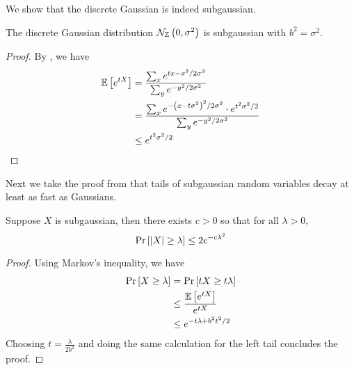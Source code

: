 \documentclass{article}
\begin{document}
We show that the discrete Gaussian is indeed subgaussian.
\begin{lemma}
	The discrete Gaussian distribution $\mathcal{N}_{\mathbb{Z}}\left(0, \sigma^2\right)$ is subgaussian with $b^2=\sigma^2$.
\end{lemma}
\begin{proof}
	By , we have
	\begin{align}
		\operatorname*{\mathbb{E}}\left[e^{tX}\right]
		&=\frac{\sum_x e^{tx-x^2/2\sigma^2}}{\sum_y e^{-y^2/2\sigma^2}} \\
		&=\frac{\sum_x e^{-\left(x-t\sigma^2\right)^2/2\sigma^2}\cdot e^{t^2\sigma^2/2}}{\sum_y e^{-y^2/2\sigma^2}} \\
		&\leq e^{t^2\sigma^2/2}
	\end{align}
\end{proof}

Next we take the proof from \cite{subgaussian} that tails of subgaussian random variables decay at least as fast as Gaussians.
\begin{lemma}
	Suppose $X$ is subgaussian, then there exists $c>0$ so that for all $\lambda>0$,
	\begin{equation}
		\Pr\left[\abs{X}\geq\lambda\right]\leq 2e^{-c\lambda^2}
	\end{equation}
\end{lemma}
\begin{proof}
	Using Markov's inequality, we have
	\begin{align}
		\Pr\left[X\geq\lambda\right]&=\Pr\left[tX\geq t\lambda\right] \\
		&\leq \frac{\operatorname*{\mathbb{E}}\left[e^{tX}\right]}{e^{tX}} \\
		&\leq e^{-t\lambda + b^2 t^2 /2}
	\end{align}
	Choosing $t=\frac{\lambda}{2b^2}$ and doing the same calculation for the left tail concludes the proof.
\end{proof}



\end{document}
